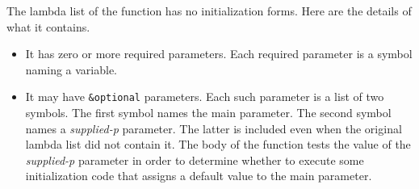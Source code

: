 The lambda list of the function has no initialization forms.  Here are
the details of what it contains. 

\begin{itemize}
\item It has zero or more required parameters.  Each required
  parameter is a symbol naming a variable.  
\item It may have \texttt{\&optional} parameters.  Each such parameter
  is a list of two symbols.  The first symbol names the main parameter.
  The second symbol names a \emph{supplied-p} parameter.  The latter
  is included even when the original lambda list did not contain it.
  The body of the function tests the value of the \emph{supplied-p}
  parameter in order to determine whether to execute some
  initialization code that assigns a default value to the main
  parameter. 
\end{itemize}

